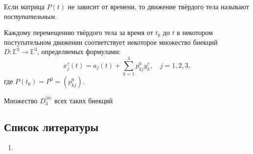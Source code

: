 \begin{definition}
  Если матрица $P(t)$ не зависит от времени, то движение твёрдого тела называют
  \textit{поступательным}.
\end{definition}

Каждому перемещению твёрдого тела за время от $t_0$ до $t$ в некотором
поступательном движении соответствует некоторое множество биекций
$D : \mathbb{E}^3 \to \mathbb{E}^3$, определяемых формулами:
\begin{equation*}
  x_j^\tau(t) = a_j(t) + \sum_{k=1}^{3} p_{kj}^0 y_k^\tau, \quad j = 1,2,3,
\end{equation*}
где $P(t_0) = P^0 = (p_{kj}^0)$.


\begin{theorem}
  Множество $D_3^{\text{(п)}}$ всех таких биекций
\end{theorem}

\subsection{Список литературы}
\begin{enumerate}
  \item \cite{lectures}
\end{enumerate}

